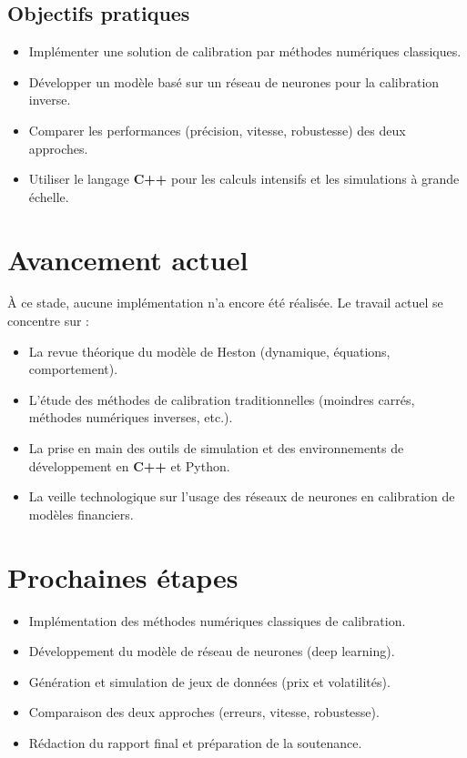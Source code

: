 \documentclass[11pt,a4paper]{article}
\begin{document}
\subsection*{Objectifs pratiques}
\begin{itemize}[label=--]
    \item Implémenter une solution de calibration par méthodes numériques classiques.
    \item Développer un modèle basé sur un réseau de neurones pour la calibration inverse.
    \item Comparer les performances (précision, vitesse, robustesse) des deux approches.
    \item Utiliser le langage \textbf{C++} pour les calculs intensifs et les simulations à grande échelle.
\end{itemize}

\section{Avancement actuel}
À ce stade, aucune implémentation n’a encore été réalisée. Le travail actuel se concentre sur :

\begin{itemize}[label=--]
    \item La revue théorique du modèle de Heston (dynamique, équations, comportement).
    \item L’étude des méthodes de calibration traditionnelles (moindres carrés, méthodes numériques inverses, etc.).
    \item La prise en main des outils de simulation et des environnements de développement en \textbf{C++} et Python.
    \item La veille technologique sur l’usage des réseaux de neurones en calibration de modèles financiers.
\end{itemize}

\section{Prochaines étapes}
\begin{itemize}[label=--]
    \item Implémentation des méthodes numériques classiques de calibration.
    \item Développement du modèle de réseau de neurones (deep learning).
    \item Génération et simulation de jeux de données (prix et volatilités).
    \item Comparaison des deux approches (erreurs, vitesse, robustesse).
    \item Rédaction du rapport final et préparation de la soutenance.
\end{itemize}
\end{document}
